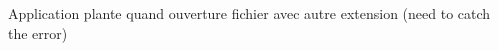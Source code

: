 
\begin{DoxyRefList}
\item[\label{bug__bug000001}%
\Hypertarget{bug__bug000001}%
File \hyperlink{mainwindow_8cpp}{mainwindow.cpp} ]Application plante quand ouverture fichier avec autre extension (need to catch the error) 
\end{DoxyRefList}